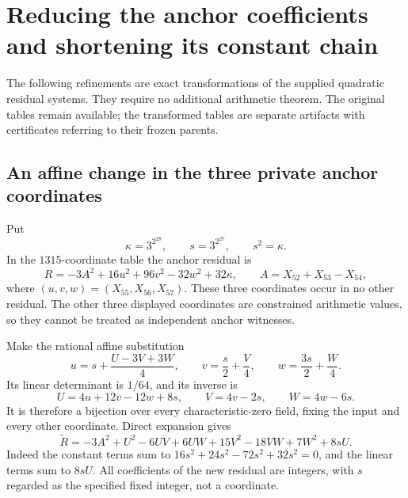 \section{Reducing the anchor coefficients and shortening its constant chain}
\label{sec:p3-affine-anchor-refinement}

The following refinements are exact transformations of the supplied
quadratic residual systems.  They require no additional arithmetic
theorem.  The original tables remain available; the transformed
tables are separate artifacts with certificates referring to their
frozen parents.

\subsection{An affine change in the three private anchor coordinates}

Put
\[
 \kappa=3^{2^{28}},\qquad s=3^{2^{27}},\qquad s^2=\kappa.
\]
In the $1315$-coordinate table the anchor residual is
\[
 R=-3A^2+16u^2+96v^2-32w^2+32\kappa,
 \qquad A=X_{52}+X_{53}-X_{54},
\]
where $(u,v,w)=(X_{55},X_{56},X_{57})$.  These three coordinates
occur in no other residual.  The other three displayed coordinates
are constrained arithmetic values, so they cannot be treated as
independent anchor witnesses.

Make the rational affine substitution
\begin{equation}\label{eq:p3-anchor-affine-map}
 u=s+\frac{U-3V+3W}{4},\qquad
 v=\frac{s}{2}+\frac V4,\qquad
 w=\frac{3s}{2}+\frac W4.
\end{equation}
Its linear determinant is $1/64$, and its inverse is
\[
 U=4u+12v-12w+8s,\qquad V=4v-2s,\qquad W=4w-6s.
\]
It is therefore a bijection over every characteristic-zero field,
fixing the input and every other coordinate.  Direct expansion gives
\begin{equation}\label{eq:p3-translated-anchor}
 \widetilde R=-3A^2+U^2-6UV+6UW+15V^2-18VW+7W^2+8sU.
\end{equation}
Indeed the constant terms sum to
$16s^2+24s^2-72s^2+32s^2=0$, and the linear terms sum to $8sU$.
All coefficients of the new residual are integers, with $s$ regarded
as the specified fixed integer, not a coordinate.

